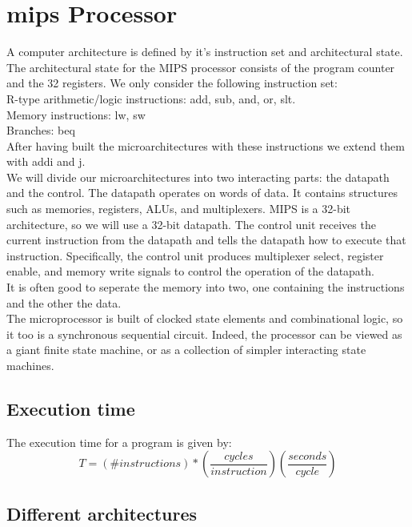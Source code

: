 \newpage
\section{mips Processor}
	A computer architecture is defined by it's instruction set and architectural state. The architectural state for the MIPS processor consists of the program counter and the 32 registers. We only consider the following instruction set:\\ R-type arithmetic/logic instructions: add, sub, and, or, slt.\\
	Memory instructions: lw, sw\\
	Branches: beq\\
	After having built the microarchitectures with these instructions we extend them with addi and j.\\
	We will divide our microarchitectures into two interacting parts: the datapath and the control. The datapath operates on words of data. It contains structures such as memories, registers, ALUs, and multiplexers. MIPS is a 32-bit architecture, so we will use a 32-bit datapath. The control unit receives the current instruction from the datapath and tells the datapath how to execute that instruction. Specifically, the control unit produces multiplexer select, register enable, and memory write signals to control the operation of the datapath.\\
	It is often good to seperate the memory into two, one containing the instructions and the other the data.\\
	The microprocessor is built of clocked state elements and combinational logic, so it too is a synchronous sequential circuit. Indeed, the processor can be viewed as a giant finite state machine, or as a collection of simpler interacting state machines.\\
	\subsection{Execution time}
	The execution time for a program is given by:
	\begin{equation}
		T= (\#instructions)*(\frac{cycles}{instruction})(\frac{seconds}{cycle})
	\end{equation}
	\subsection{Different architectures}
